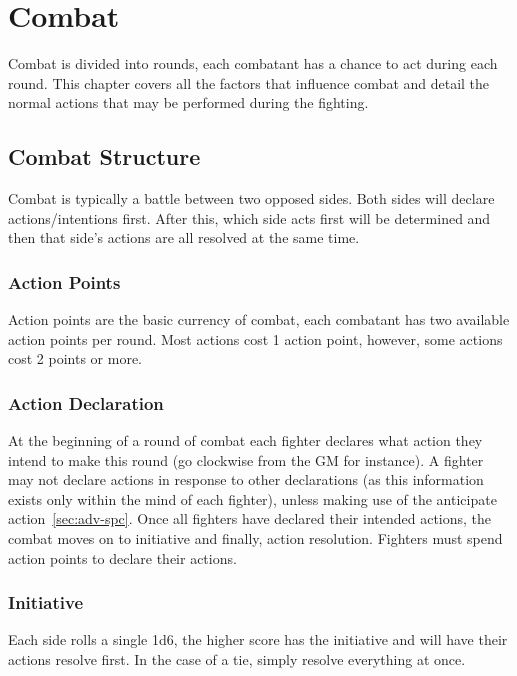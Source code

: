 \documentclass[a4paper,10pt,oneside]{book}
\newcommand{\textlf}[1]{\textbf{\titlecap{#1}}}
\newcommand{\textlfirst}[1]{\textbf{\textit{\titlecap{#1}}}}
\begin{document}
\chapter{Combat}
\label{chap:combat}
Combat is divided into rounds, each combatant has a chance to act during each round. This chapter covers all the factors that influence combat and detail the normal actions that may be performed during the fighting.

\section{Combat Structure}
Combat is typically a battle between two opposed sides. Both sides will declare actions/intentions first. After this, which side acts first will be determined and then that side's actions are all resolved at the same time.  

\subsection{Action Points}
Action points are the basic currency of combat, each combatant has two available action points per round. Most actions cost 1 action point, however, some actions cost 2 points or more. 

\subsection{Action Declaration}
At the beginning of a round of combat each fighter declares what action they intend to make this round (go clockwise from the GM for instance). A fighter may not declare actions in response to other declarations (as this information exists only within the mind of each fighter), unless making use of the anticipate action~\ref{sec:adv-spc}. Once all fighters have declared their intended actions, the combat moves on to initiative and finally, action resolution. Fighters must spend action points to declare their actions.


\subsection{Initiative}
Each side rolls a single 1d6, the higher score has the initiative and will have their actions resolve first. In the case of a tie, simply resolve everything at once.
\end{document}
